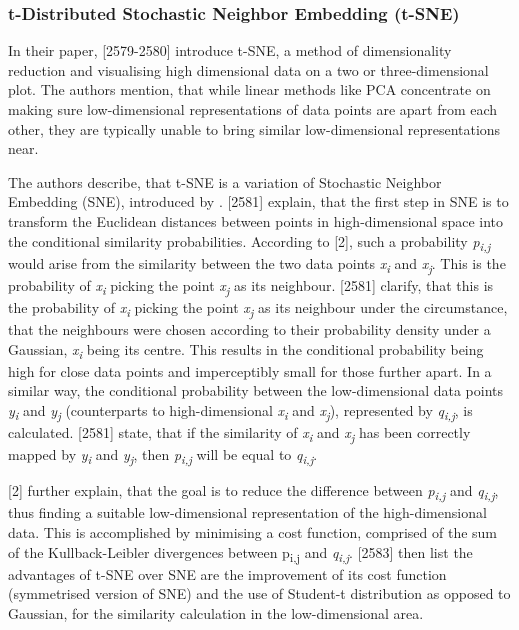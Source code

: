 \subsubsection{t-Distributed Stochastic Neighbor Embedding (t-SNE)}
\label{section:tSNE}
In their paper, \textcite{maaten2008visualizing}[2579-2580] introduce t-SNE, a method of dimensionality reduction and visualising high dimensional data on a two or three-dimensional plot. The authors mention, that while linear methods like PCA concentrate on making sure low-dimensional representations of data points are apart from each other, they are typically unable to bring similar low-dimensional representations near. 

The authors describe, that t-SNE is a variation of Stochastic Neighbor Embedding (SNE), introduced by \textcite{hinton2003stochastic}. \textcite{maaten2008visualizing}[2581] explain, that the first step in SNE is to transform the Euclidean distances between points in high-dimensional space into the conditional similarity probabilities. According to \textcite{hinton2003stochastic}[2], such a probability \textit{p\textsubscript{i,j}} would arise from the similarity between the two data points \textit{x\textsubscript{i}} and \textit{x\textsubscript{j}}. This is the probability of \textit{x\textsubscript{i}} picking the point \textit{x\textsubscript{j}} as its neighbour. \textcite{maaten2008visualizing}[2581] clarify, that this is the probability of \textit{x\textsubscript{i}} picking the point \textit{x\textsubscript{j}} as its neighbour under the circumstance, that the neighbours were chosen according to their probability density under a Gaussian, \textit{x\textsubscript{i}} being its centre. This results in the conditional probability being high for close data points and imperceptibly small for those further apart.
In a similar way, the conditional probability between the low-dimensional data points \textit{y\textsubscript{i}} and \textit{y\textsubscript{j}} (counterparts to high-dimensional \textit{x\textsubscript{i}} and \textit{x\textsubscript{j}}), represented by \textit{q\textsubscript{i,j}}, is calculated. 
\textcite{maaten2008visualizing}[2581] state, that if the similarity of \textit{x\textsubscript{i}} and \textit{x\textsubscript{j}} has been correctly mapped by \textit{y\textsubscript{i}} and \textit{y\textsubscript{j}}, then \textit{p\textsubscript{i,j}} will be equal to \textit{q\textsubscript{i,j}}. 


\textcite{hinton2003stochastic}[2] further explain, that the goal is to reduce the difference between \textit{p\textsubscript{i,j}} and \textit{q\textsubscript{i,j}}, thus finding a suitable low-dimensional representation of the high-dimensional data. This is accomplished by minimising a cost function, comprised of the sum of the Kullback-Leibler divergences between {p\textsubscript{i,j}} and \textit{q\textsubscript{i,j}}. 
\textcite{maaten2008visualizing}[2583] then list the advantages of t-SNE over SNE are the improvement of its cost function (symmetrised version of SNE) and the use of Student-t distribution as opposed to Gaussian, for the similarity calculation in the low-dimensional area.



